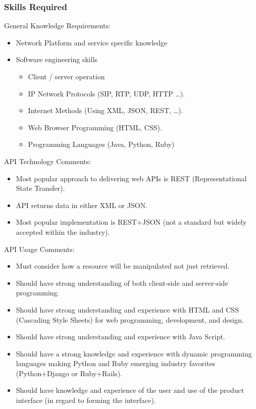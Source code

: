 \documentclass[12pt]{article}
\begin{document}
\begin{spacing}{1.5}
\newpage
\subsubsection{Skills Required}
General Knowledge Requirements:
\begin{itemize}
	\item
	Network Platform and service specific knowledge
	\item
	Software engineering skills
		\begin{itemize}
			\item
			Client / server operation
			\item
			IP Network Protocols (SIP, RTP, UDP, HTTP …).
			\item
			Internet Methods (Using XML, JSON, REST, …).
			\item
			Web Browser Programming (HTML, CSS).
			\item
			Programming Languages (Java, Python, Ruby)
		\end{itemize}	
\end{itemize}
API Technology Comments:
\begin{itemize}
	\item
	Most popular approach to delivering web APIs is REST (Representational State 				Transfer).
	\item
	API returns data in either XML or JSON.
	\item
	Most popular implementation is REST+JSON (not a standard but widely accepted within 		the industry).
\end{itemize}
API Usage Comments:
\begin{itemize}
	\item
	Must consider how a resource will be manipulated not just retrieved.
	\item
	Should have strong understanding of both client-side and server-side programming.
	\item
	Should have strong understanding and experience with HTML and CSS (Cascading Style 			Sheets) for web programming, development, and design.
	\item
	Should have strong understanding and experience with Java Script.
	\item
	Should have a strong knowledge and experience with dynamic programming languages 			making Python and Ruby emerging industry favorites (Python+Django or Ruby+Rails).
	\item
	Should have knowledge and experience of the user and use of the product interface (in 	regard to forming the interface).
\end{itemize}	
\end{spacing}
\end{document}
